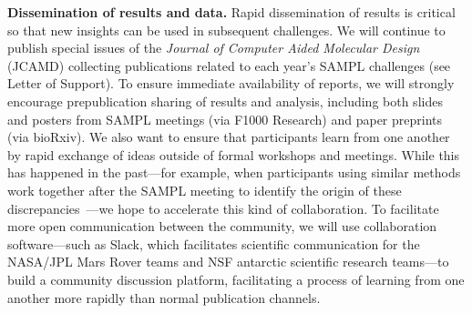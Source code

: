 \documentclass[11pt]{article}
\begin{document}
{\bf Dissemination of results and data.}
Rapid dissemination of results is critical so that new insights can be used in subsequent challenges.
We will continue to publish special issues of the \emph{Journal of Computer Aided Molecular Design} (JCAMD) collecting publications related to each year's SAMPL challenges (see Letter of Support).
To ensure immediate availability of reports, we will strongly encourage prepublication sharing of results and analysis, including both slides and posters from SAMPL meetings (via F1000 Research) and paper preprints (via bioRxiv).
We also want to ensure that participants learn from one another by rapid exchange of ideas outside of formal workshops and meetings.
While this has happened in the past---for example, when participants using similar methods work together after the SAMPL meeting to identify the origin of these discrepancies~\cite{monroe_converging_2014, yin_overview_2016, bhakat_resolving_2016, bosisio_blinded_2016, mobley_predicting_2016}---we hope to accelerate this kind of collaboration.
To facilitate more open communication between the community, we will use collaboration software---such as Slack, which facilitates scientific communication for the NASA/JPL Mars Rover teams and NSF antarctic scientific research teams---to build a community discussion platform, 
facilitating a process of learning from one another more rapidly than normal publication channels.
\end{document}
